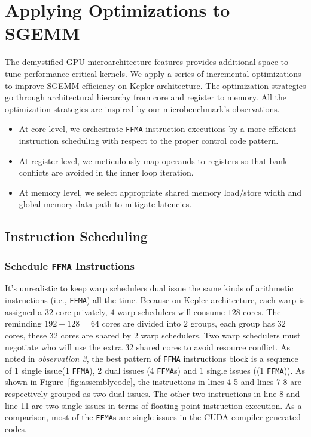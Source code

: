 \section{Applying Optimizations to SGEMM}
\label{sec:optimization}


The demystified GPU microarchitecture features provides additional space to tune performance-critical kernels. We apply 
a series of incremental optimizations to improve SGEMM efficiency on Kepler architecture. The optimization strategies 
go through architectural hierarchy from core and register to memory. All the optimization strategies are inspired by 
our microbenchmark's observations.
\begin{itemize}
\item At core level, we orchestrate {\tt FFMA} instruction executions by a more efficient instruction scheduling with 
respect to the proper control code pattern.
\item At register level, we meticulously map operands to registers so that bank conflicts are avoided in the inner loop 
iteration.
\item At memory level, we select appropriate shared memory load/store width and global memory data path to mitigate 
latencies.
\end{itemize}

\subsection{Instruction Scheduling}
\subsubsection{Schedule {\tt FFMA} Instructions}
It's unrealistic to keep warp schedulers dual issue the same kinds of arithmetic instructions (i.e., {\tt FFMA}) all 
the time. Because on Kepler architecture, each warp is assigned a $32$ core privately, $4$ warp schedulers will consume 
$128$ cores. The reminding $192-128=64$ cores are divided into $2$ groups, each group has $32$ cores, these $32$ cores 
are shared by $2$ warp schedulers. Two warp schedulers must negotiate who will use the extra $32$ shared cores to avoid 
resource conflict.
As noted in {\em observation 3}, the best pattern of {\tt FFMA} instructions block is a sequence of $1$ single issue(1 
{\tt FFMA}), 2 dual issues (4 {\tt FFMA}s) and 1 single issues ((1 {\tt FFMA})). As shown in 
Figure~\ref{fig:assemblycode}, the instructions in lines 4-5 and lines 7-8 are respectively grouped as two dual-issues. 
The other two instructions in line 8 and line 11 are two single issues in terms of floating-point instruction 
execution. As a comparison, most of the {\tt FFMA}s are single-issues in the CUDA compiler generated codes.

